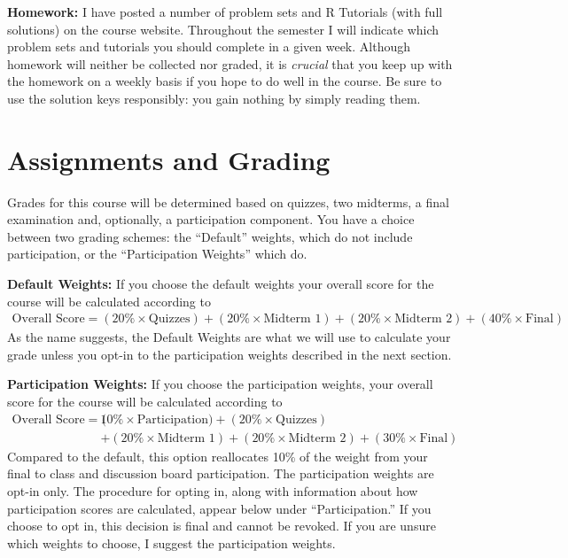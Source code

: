 \documentclass[11pt, letterpaper]{article}
\begin{document}
\medskip

\noindent \textbf{Homework:} 
I have posted a number of problem sets and R Tutorials (with full solutions) on the course website.
Throughout the semester I will indicate which problem sets and tutorials you should complete in a given week.
Although homework will neither be collected nor graded, it is \emph{crucial} that you keep up with the homework on a weekly basis if you hope to do well in the course.
Be sure to use the solution keys responsibly: you gain nothing by simply reading them.



\section*{Assignments and Grading}

Grades for this course will be determined based on quizzes, two midterms, a final examination and, optionally, a participation component.
You have a choice between two grading schemes: the ``Default'' weights, which do not include participation, or the ``Participation Weights'' which do. 

\bigskip 

\noindent \textbf{Default Weights:} If you choose the default weights your overall score for the course will be calculated according to
	\begin{equation*}
	\begin{split}
		\mbox{Overall Score} = (20\% \times \mbox{Quizzes})  + (20\% \times \mbox{Midterm 1}) + (20\% \times \mbox{Midterm 2}) + (40\% \times \mbox{Final})
	\end{split}
	\end{equation*}
As the name suggests, the Default Weights are what we will use to calculate your grade unless you opt-in to the participation weights described in the next section.

\bigskip

\noindent \textbf{Participation Weights:} If you choose the participation weights, your overall score for the course will be calculated according to
	\begin{equation*}
	\begin{split}
		\mbox{Overall Score} = (&10\% \times \mbox{Participation}) + (20\% \times \mbox{Quizzes})  \\ &
							 + (20\% \times \mbox{Midterm 1}) + (20\% \times \mbox{Midterm 2}) + (30\% \times \mbox{Final})
	\end{split}
	\end{equation*}
Compared to the default, this option reallocates 10\% of the weight from your final to class and discussion board participation.
The participation weights are opt-in only.
The procedure for opting in, along with information about how participation scores are calculated, appear below under ``Participation.''
If you choose to opt in, this decision is final and cannot be revoked.
If you are unsure which weights to choose, I suggest the participation weights. 
\end{document}
